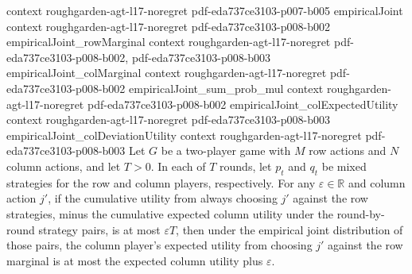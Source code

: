 \begin{lemma}
  {context}
  {roughgarden-agt-l17-noregret}
  {pdf-eda737ce3103-p007-b005}
\proofstep
  {empiricalJoint}
  {context}
  {roughgarden-agt-l17-noregret}
  {pdf-eda737ce3103-p008-b002}
\proofstep
  {empiricalJoint_rowMarginal}
  {context}
  {roughgarden-agt-l17-noregret}
  {pdf-eda737ce3103-p008-b002,
    pdf-eda737ce3103-p008-b003}
\proofstep
  {empiricalJoint_colMarginal}
  {context}
  {roughgarden-agt-l17-noregret}
  {pdf-eda737ce3103-p008-b002}
\proofstep
  {empiricalJoint_sum_prob_mul}
  {context}
  {roughgarden-agt-l17-noregret}
  {pdf-eda737ce3103-p008-b002}
\proofstep
  {empiricalJoint_colExpectedUtility}
  {context}
  {roughgarden-agt-l17-noregret}
  {pdf-eda737ce3103-p008-b003}
\proofstep
  {empiricalJoint_colDeviationUtility}
  {context}
  {roughgarden-agt-l17-noregret}
  {pdf-eda737ce3103-p008-b003}
Let $G$ be a two-player game with $M$ row actions and $N$ column actions, and let $T>0$.
In each of $T$ rounds, let $p_t$ and $q_t$ be mixed strategies for the row and column
players, respectively. For any $\varepsilon\in\mathbb{R}$ and column action $j'$, if the
cumulative utility from always choosing $j'$ against the row strategies, minus the
cumulative expected column utility under the round-by-round strategy pairs, is at most
$\varepsilon T$, then under the empirical joint distribution of those pairs, the column
player's expected utility from choosing $j'$ against the row marginal is at most the
expected column utility plus $\varepsilon$.
\end{lemma}
